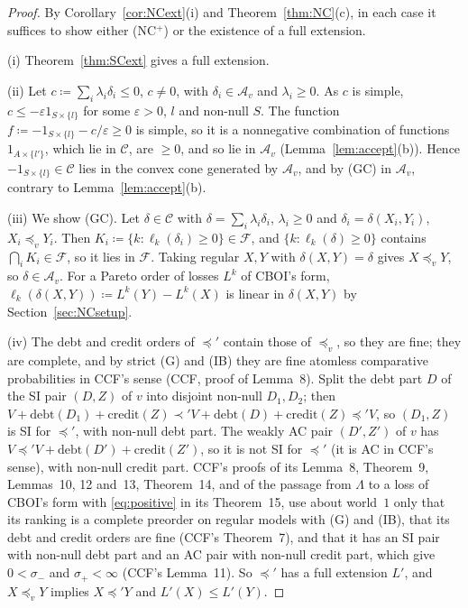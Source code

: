 \documentclass[11pt]{article}
\theoremstyle{definition}\newtheorem{definition}[theorem]{Definition}
\theoremstyle{remark}\newtheorem{remark}[theorem]{Remark}
\newcommand{\debt}{\mathrm{debt}}
\newcommand{\cred}{\mathrm{credit}}
\begin{document}
\begin{proof}
By Corollary~\ref{cor:NCext}(i) and Theorem~\ref{thm:NC}(c), in each case it
suffices to show either (NC$^+$) or the existence of a full extension.

(i) Theorem~\ref{thm:SCext} gives a full extension.

(ii) Let $c\coloneqq\sum_i\lambda_i\delta_i\le0$, $c\ne0$, with
$\delta_i\in\mathcal A_v$ and $\lambda_i\ge0$. As $c$ is simple, $c\le
-\varepsilon1_{S\times\{l\}}$ for some $\varepsilon>0$, $l$ and non-null
$S$. The function $f\coloneqq-1_{S\times\{l\}}-c/\varepsilon\ge0$ is simple,
so it is a nonnegative combination of functions $1_{A\times\{l'\}}$, which
lie in $\mathcal C$, are $\ge0$, and so lie in $\mathcal A_v$
(Lemma~\ref{lem:accept}(b)). Hence $-1_{S\times\{l\}}\in\mathcal C$ lies in
the convex cone generated by $\mathcal A_v$, and by (GC) in $\mathcal A_v$,
contrary to Lemma~\ref{lem:accept}(b).

(iii) We show (GC). Let $\delta\in\mathcal C$ with
$\delta=\sum_i\lambda_i\delta_i$, $\lambda_i\ge0$ and
$\delta_i=\delta(X_i,Y_i)$, $X_i\preceq_vY_i$. Then
$K_i\coloneqq\{k:\ell_k(\delta_i)\ge0\}\in\mathcal F$, and
$\{k:\ell_k(\delta)\ge0\}$ contains $\bigcap_iK_i\in\mathcal F$, so it lies
in $\mathcal F$. Taking regular $X,Y$ with $\delta(X,Y)=\delta$ gives
$X\preceq_vY$, so $\delta\in\mathcal A_v$. For a Pareto order of losses $L^k$
of CBOI's form, $\ell_k(\delta(X,Y))\coloneqq L^k(Y)-L^k(X)$ is linear in
$\delta(X,Y)$ by Section~\ref{sec:NCsetup}.

(iv) The debt and credit orders of $\preceq'$ contain those of $\preceq_v$,
so they are fine; they are complete, and by strict (G) and (IB) they are
fine atomless comparative probabilities in CCF's sense (CCF, proof of
Lemma~8). Split the debt part $D$ of the SI pair $(D,Z)$ of $v$ into disjoint
non-null $D_1,D_2$; then $V+\debt(D_1)+\cred(Z)\prec'V+\debt(D)+\cred(Z)
\preceq'V$, so $(D_1,Z)$ is SI for $\preceq'$, with non-null debt part. The
weakly AC pair $(D',Z')$ of $v$ has $V\preceq'V+\debt(D')+\cred(Z')$, so it
is not SI for $\preceq'$ (it is AC in CCF's sense), with non-null credit
part. CCF's proofs of its Lemma~8, Theorem~9, Lemmas~10, 12 and~13,
Theorem~14, and of the passage from $\Lambda$ to a loss of CBOI's form with
\eqref{eq:positive} in its Theorem~15, use about world~$1$ only that its
ranking is a complete preorder on regular models with (G) and (IB), that its
debt and credit orders are fine (CCF's Theorem~7), and that it has an SI pair
with non-null debt part and an AC pair with non-null credit part, which give
$0<\sigma_-$ and $\sigma_+<\infty$ (CCF's Lemma~11). So $\preceq'$ has a full
extension $L'$, and $X\preceq_vY$ implies $X\preceq'Y$ and
$L'(X)\le L'(Y)$.
\end{proof}
\end{document}
